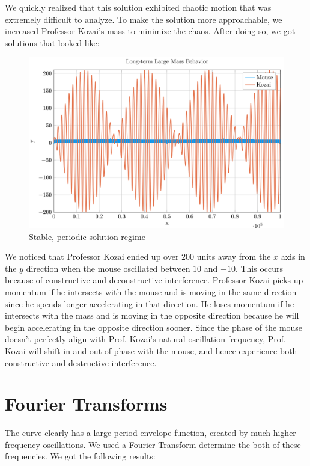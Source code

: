 \documentclass{article}
\begin{document}
\begin{multicols}{2}
  We quickly realized that this solution exhibited chaotic motion that was extremely difficult to analyze. To make the solution more approachable, we increased Professor Kozai’s mass to minimize the chaos. After doing so, we got solutions that looked like:

  \begin{figure}[H]
    \includegraphics[scale=0.2]{longterm}
    \caption{Stable, periodic solution regime}
  \end{figure}

  We noticed that Professor Kozai ended up over $200$ units away from the $x$ axis in the $y$ direction when the mouse oscillated between $10$ and $-10$. This occurs because of constructive and deconstructive interference. Professor Kozai picks up momentum if he intersects with the mouse and is moving in the same direction since he spends longer accelerating in that direction. He loses momentum if he intersects with the mass and is moving in the opposite direction because he will begin accelerating in the opposite direction sooner. Since the phase of the mouse doesn’t perfectly align with Prof. Kozai’s natural oscillation frequency, Prof. Kozai will shift in and out of phase with the mouse, and hence experience both constructive and destructive interference.

  \section{Fourier Transforms}
  The curve clearly has a large period envelope function, created by much higher frequency oscillations. We used a Fourier Transform determine the both of these frequencies. We got the following results:



\end{multicols}
\end{document}
